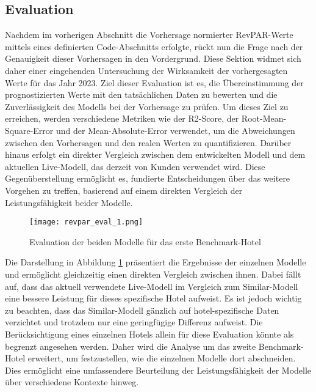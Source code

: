 \subsection{Evaluation}
\label{subsec:revpar_eval}
Nachdem im vorherigen Abschnitt die Vorhersage normierter RevPAR-Werte mittels eines definierten Code-Abschnitts erfolgte, rückt nun die Frage nach der Genauigkeit dieser Vorhersagen in den Vordergrund. Diese Sektion widmet sich daher einer eingehenden Untersuchung der Wirksamkeit der vorhergesagten Werte für das Jahr 2023. Ziel dieser Evaluation ist es, die Übereinstimmung der prognostizierten Werte mit den tatsächlichen Daten zu bewerten und die Zuverlässigkeit des Modells bei der Vorhersage zu prüfen.
\newline
\newline
Um dieses Ziel zu erreichen, werden verschiedene Metriken wie der R2-Score, der Root-Mean-Square-Error und der Mean-Absolute-Error verwendet, um die Abweichungen zwischen den Vorhersagen und den realen Werten zu quantifizieren. Darüber hinaus erfolgt ein direkter Vergleich zwischen dem entwickelten Modell und dem aktuellen Live-Modell, das derzeit von Kunden verwendet wird. Diese Gegenüberstellung ermöglicht es, fundierte Entscheidungen über das weitere Vorgehen zu treffen, basierend auf einem direkten Vergleich der Leistungsfähigkeit beider Modelle.

\begin{figure}[h]
    \centering
    \texttt{[image: revpar\_eval\_1.png]}
    \caption[Evaluation der beiden Modelle für das erste Benchmark-Hotel]{Evaluation der beiden Modelle für das erste Benchmark-Hotel}
    \label{img:revpar_eval_1}
\end{figure}

Die Darstellung in Abbildung \ref{img:revpar_eval_1} präsentiert die Ergebnisse der einzelnen Modelle und ermöglicht gleichzeitig einen direkten Vergleich zwischen ihnen. Dabei fällt auf, dass das aktuell verwendete Live-Modell im Vergleich zum Similar-Modell eine bessere Leistung für dieses spezifische Hotel aufweist. Es ist jedoch wichtig zu beachten, dass das Similar-Modell gänzlich auf hotel-spezifische Daten verzichtet und trotzdem nur eine geringfügige Differenz aufweist.
\newline
\newline
Die Berücksichtigung eines einzelnen Hotels allein für diese Evaluation könnte als begrenzt angesehen werden. Daher wird die Analyse um das zweite Benchmark-Hotel erweitert, um festzustellen, wie die einzelnen Modelle dort abschneiden. Dies ermöglicht eine umfassendere Beurteilung der Leistungsfähigkeit der Modelle über verschiedene Kontexte hinweg.

